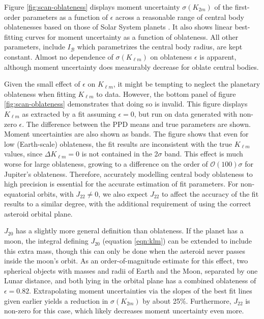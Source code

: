 \documentclass[fleqn,usenatbib]{mnras}
\begin{document}
Figure \ref{fig:scan-oblateness} displays moment uncertainty $\sigma(K_{2 m})$ of the first-order parameters as a function of $\epsilon$ across a reasonable range of central body oblatenesses based on those of Solar System planets \citep{paterLissauer2015}. It also shows linear best-fitting curves for moment uncertainty as a function of oblateness. All other parameters, include $I_\mathcal{B}$ which parametrizes the central body radius, are kept constant. Almost no dependence of $\sigma(K_{\ell m})$ on oblateness $\epsilon$ is apparent, although moment uncertainty does measurably decrease for oblate central bodies.

Given the small effect of $\epsilon$ on $K_{\ell m}$, it might be tempting to neglect the planetary oblateness when fitting $K_{\ell m}$ to data. However, the bottom panel of figure \ref{fig:scan-oblateness} demonstrates that doing so is invalid. This figure displays $K_{\ell m}$ as extracted by a fit assuming $\epsilon = 0$, but run on data generated with non-zero $\epsilon$. The difference between the PPD means and true parameters are shown. Moment uncertainties are also shown as bands. The figure shows that even for low (Earth-scale) oblateness, the fit results are inconsistent with the true $K_{\ell m}$ values, since $\Delta K_{\ell m} = 0$ is not contained in the 2$\sigma$ band. This effect is much worse for large oblateness, growing to a difference on the order of $\mathcal{O}(100)\sigma$ for Jupiter's oblateness. Therefore, accurately modelling central body oblateness to high precision is essential for the accurate estimation of fit parameters. For non-equatorial orbits, with $J_{22} \neq 0$, we also expect $J_{22}$ to affect the accuracy of the fit results to a similar degree, with the additional requirement of using the correct asteroid orbital plane.

$J_{20}$ has a slightly more general definition than oblateness. If the planet has a moon, the integral defining $J_{20}$ (equation \ref{eqn:klm}) can be extended to include this extra mass, though this can only be done when the asteroid never passes inside the moon's orbit. As an order-of-magnitude estimate for this effect, two spherical objects with masses and radii of Earth and the Moon, separated by one Lunar distance, and both lying in the orbital plane has a combined oblateness of $\epsilon = 0.82$. Extrapolating moment uncertainties via the slopes of the best fit lines given earlier yields a reduction in $\sigma(K_{2m})$ by about 25\%. Furthermore, $J_{22}$ is non-zero for this case, which likely decreases moment uncertainty even more.
\end{document}
